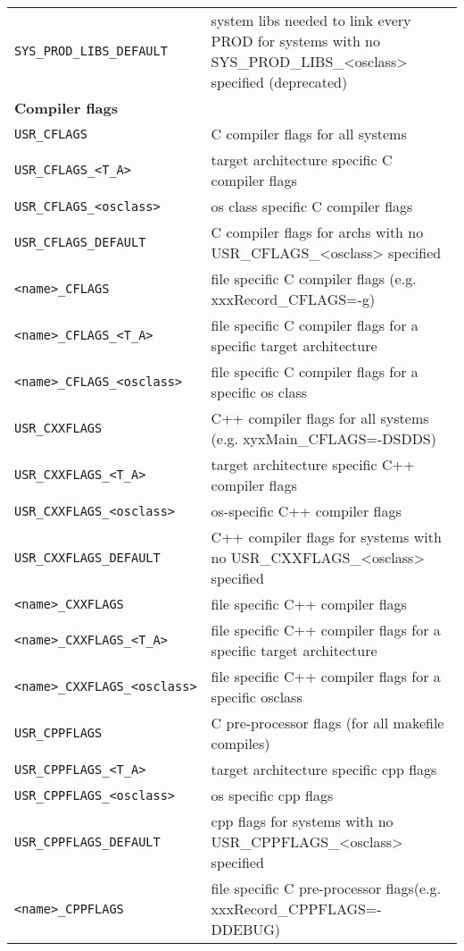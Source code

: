 \begin{center}
\begin{longtable}{p{2.94784in}p{3.76247in}}
\verb|SYS_PROD_LIBS_DEFAULT| & system libs needed to link every PROD for systems with no SYS\_PROD\_LIBS\_\textless{}osclass\textgreater{} specified (deprecated)\\
\textbf{Compiler flags} & \\
\hline
\verb|USR_CFLAGS| & C compiler flags for all systems\\
\verb|USR_CFLAGS_<T_A>| & target architecture specific C compiler flags\\
\verb|USR_CFLAGS_<osclass>| & os class specific C compiler flags\\
\verb|USR_CFLAGS_DEFAULT| & C compiler flags for archs with no USR\_CFLAGS\_\textless{}osclass\textgreater{} specified\\
\verb|<name>_CFLAGS| & file specific C compiler flags (e.g. xxxRecord\_CFLAGS=-g)\\
\verb|<name>_CFLAGS_<T_A>| & file specific C compiler flags for a specific target architecture\\
\verb|<name>_CFLAGS_<osclass>| & file specific C compiler flags for a specific os class\\
\verb|USR_CXXFLAGS| & C++ compiler flags for all systems (e.g. xyxMain\_CFLAGS=-DSDDS)\\
\verb|USR_CXXFLAGS_<T_A>| & target architecture specific C++ compiler flags\\
\verb|USR_CXXFLAGS_<osclass>| & os-specific C++ compiler flags\\
\verb|USR_CXXFLAGS_DEFAULT| & C++ compiler flags for systems with no USR\_CXXFLAGS\_\textless{}osclass\textgreater{} specified\\
\verb|<name>_CXXFLAGS| & file specific C++ compiler flags\\
\verb|<name>_CXXFLAGS_<T_A>| & file specific C++ compiler flags for a specific target architecture\\
\verb|<name>_CXXFLAGS_<osclass>| & file specific C++ compiler flags for a specific osclass\\
\verb|USR_CPPFLAGS| & C pre-processor flags (for all makefile compiles)\\
\verb|USR_CPPFLAGS_<T_A>| & target architecture specific cpp flags\\
\verb|USR_CPPFLAGS_<osclass>| & os specific cpp flags\\
\verb|USR_CPPFLAGS_DEFAULT| & cpp flags for systems with no USR\_CPPFLAGS\_\textless{}osclass\textgreater{} specified\\
\verb|<name>_CPPFLAGS| & file specific C pre-processor flags(e.g. xxxRecord\_CPPFLAGS=-DDEBUG)\\

\end{longtable}
\end{center}
